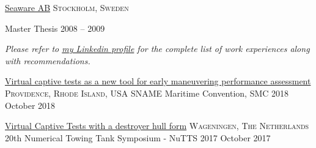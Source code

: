 \documentclass[10pt,a4paper]{article} %
\begin{document}
\headedsection %
{\href{http://www.stormgeo.com/}{Seaware AB}}
{\textsc{Stockholm, Sweden}} {

\headedsubsection %
{Master Thesis}
{2008 -- 2009}
{}
}

\begin{center}
\textit{Please refer to \href{http://www.linkedin.com/in/ciesbreijs}{my Linkedin profile} for the complete list of work experiences along with recommendations.}
\end{center}


\spacedhrule{-0.2em}{-0.4em} %



\headedsection 
{\href{https://www.researchgate.net/publication/332671240_Virtual_captive_tests_as_a_new_tool_for_early_maneuvering_performance_assessment}{Virtual captive tests as a new tool for early maneuvering performance assessment}}
{\textsc{Providence, Rhode Island, USA}} {
\headedsubsection %
{SNAME Maritime Convention, SMC 2018}
{October 2018}
{\bodytext{ }}
}

\headedsection 
{\href{https://www.researchgate.net/publication/320299350_Virtual_Captive_Tests_with_a_destroyer_hull_form}{Virtual Captive Tests with a destroyer hull form}}
{\textsc{Wageningen, The Netherlands}} {
\headedsubsection %
{20th Numerical Towing Tank Symposium - NuTTS 2017}
{October 2017}
{\bodytext{ }}
}

 



\spacedhrule{0.5em}{-0.4em} %


\end{document}
